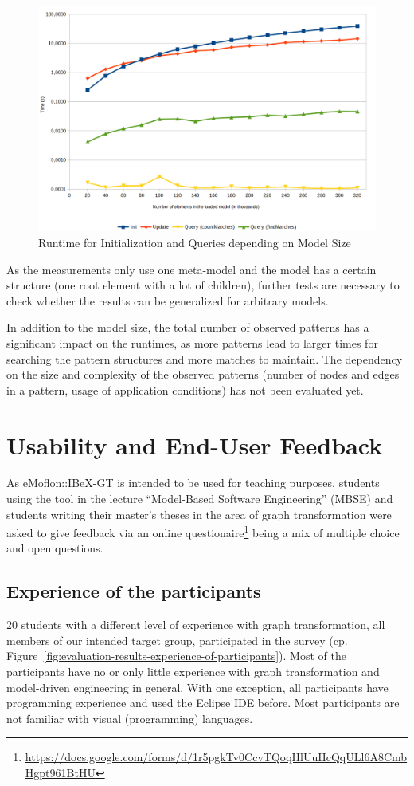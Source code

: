 \begin{figure}[h!]
	\centering
	\includegraphics[width=\linewidth]{../common/figures/evaluation-runtime2-logarithmic}
	\caption{Runtime for Initialization and Queries depending on Model Size}
	\label{fig:evaluation-runtime2}
\end{figure}

\noindent
As the measurements only use one meta-model and the model has a certain structure (one root element with a lot of children), further tests are necessary to check whether the results can be generalized for arbitrary models.

In addition to the model size, the total number of observed patterns has a significant impact on the runtimes, as more patterns lead to larger times for searching the pattern structures and more matches to maintain.
The dependency on the size and complexity of the observed patterns (\eg number of nodes and edges in a pattern, usage of application conditions) has not been evaluated yet.

\section{Usability and End-User Feedback}
\label{evaluation-usability}
As eMoflon::IBeX-GT is intended to be used for teaching purposes, students using the tool in the lecture ``Model-Based Software Engineering'' (MBSE) and students writing their master's theses in the area of graph transformation were asked to give feedback via an online questionaire\footnote{\url{https://docs.google.com/forms/d/1r5pgkTv0CcvTQoqHlUuHcQqULl6A8CmbHgpt961BtHU}} being a mix of multiple choice and open questions.

\subsection{Experience of the participants}
20 students with a different level of experience with graph transformation, all members of our intended target group, participated in the survey (cp. Figure~\ref{fig:evaluation-results-experience-of-participants}).
Most of the participants have no or only little experience with graph transformation and model-driven engineering in general.
With one exception, all participants have programming experience and used the Eclipse IDE before.
Most participants are not familiar with visual (programming) languages.

